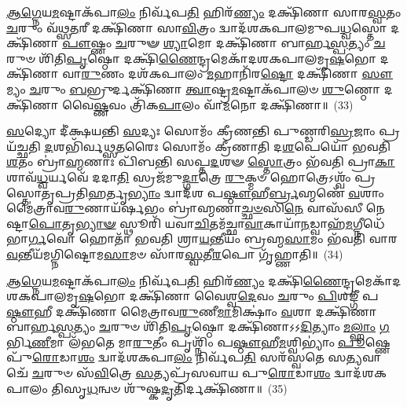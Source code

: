 {\anuvakamend[{\-\ul{𑌸}\-𑌤𑍍𑌯𑍗𑌜𑌾॑𑌶𑍍𑌚𑌤𑍍𑌵𑌾\-\ul{𑌰𑌿}\-\-\ul{𑍞}\-𑌶𑌚𑍍𑌚᳴}]}%

\-\ul{𑌆}\-\-\ul{𑌗𑍍𑌨𑍇}\-𑌯\-\ul{𑌮}\-𑌷𑍍𑌟𑌾\-𑌕᳴𑌪𑌾\-\ul{𑌲𑌂} 𑌨𑌿𑌰𑍍𑌵᳴𑌪\-\ul{𑌤𑌿} 𑌹𑌿𑌰᳴\-\ul{𑌣𑍍𑌯𑌂} 𑌦𑌕𑍍𑌷𑌿᳴𑌣𑌾 𑌸𑌾𑌰\-\ul{𑌸𑍍𑌵}\-𑌤𑌂 \ul{𑌚}\-𑌰𑍁𑌂 𑌵᳴𑌥𑍍𑌸\-\ul{𑌤}\-𑌰𑍀 𑌦𑌕𑍍𑌷𑌿᳴𑌣𑌾 𑌸𑌾\-\ul{𑌵𑌿}\-𑌤𑍍𑌰𑌂 𑌦𑍍𑌵𑌾𑌦᳴𑌶\-𑌕𑌪𑌾𑌲𑌮𑍁𑌪\-\ul{𑌧𑍍𑌵}\-𑌸𑍍𑌤𑍋 𑌦𑌕𑍍𑌷𑌿᳴𑌣𑌾 \ul{𑌪𑍗}\-𑌷𑍍𑌣𑌂 \ul{𑌚}\-𑌰𑍁𑍟 \ul{𑌶𑍍𑌯𑌾}\-𑌮𑍋 𑌦𑌕𑍍𑌷𑌿᳴𑌣𑌾 𑌬𑌾𑌰𑍍\mbox{}𑌹\-\ul{𑌸𑍍𑌪}\-𑌤𑍍𑌯𑌂 \ul{𑌚}\-𑌰𑍁𑍞 𑌶𑌿᳴𑌤𑌿\-\ul{𑌪𑍃}\-𑌷𑍍𑌠𑍋 𑌦𑌕𑍍𑌷𑌿᳴\-\ul{𑌣𑍈}\-𑌨𑍍𑌦𑍍𑌰𑌮𑍇𑌕𑌾᳴\-𑌦𑌶\-𑌕𑌪𑌾𑌲𑌮𑍃\-\ul{𑌷}\-𑌭𑍋 𑌦𑌕𑍍𑌷𑌿᳴𑌣𑌾 𑌵𑌾\-\ul{𑌰𑍁}\-𑌣𑌂 𑌦𑌶᳴\-𑌕𑌪𑌾𑌲𑌂 \ul{𑌮}\-𑌹𑌾𑌨𑌿᳴𑌰\-\ul{𑌷𑍍𑌟𑍋} 𑌦𑌕𑍍𑌷𑌿᳴𑌣𑌾 \ul{𑌸𑍗}\-𑌮𑍍𑌯𑌂 \ul{𑌚}\-𑌰𑍁𑌂 \ul{𑌬}\-𑌭𑍍𑌰𑍁𑌰𑍍𑌦𑌕𑍍𑌷𑌿᳴𑌣𑌾 \ul{𑌤𑍍𑌵𑌾}\-𑌷𑍍𑌟𑍍𑌰\-\ul{𑌮}\-𑌷𑍍𑌟𑌾𑌕᳴𑌪𑌾𑌲𑍞 \ul{𑌶𑍁}\-𑌣𑍍𑌠𑍋 𑌦𑌕𑍍𑌷𑌿᳴𑌣𑌾 𑌵𑍈\-\ul{𑌷𑍍𑌣}\-𑌵𑌂 𑌤𑍍𑌰𑌿᳴𑌕\-\ul{𑌪𑌾}\-𑌲𑌂 𑌵𑌾᳴\-\ul{𑌮}\-𑌨𑍋 𑌦𑌕𑍍𑌷𑌿᳴𑌣𑌾॥~(33)

{\anuvakamend[{\-\ul{𑌆}\-\-\ul{𑌗𑍍𑌨𑍇}\-𑌯𑌂 𑌦𑍍𑌵𑌿𑌚᳴𑌤𑍍𑌵𑌾𑌰𑌿𑍞𑌶𑌤𑍍}]}%

\-\ul{𑌸}\-𑌦𑍍𑌯𑍋 𑌦𑍀॑𑌕𑍍𑌷𑌯𑌨𑍍𑌤𑌿 \ul{𑌸}\-𑌦𑍍𑌯𑌃 𑌸𑍋𑌮𑌂᳴ 𑌕𑍍𑌰𑍀𑌣𑌨𑍍𑌤𑌿 𑌪𑍁𑌣𑍍𑌡𑌰𑌿\-\ul{𑌸𑍍𑌰}\-𑌜𑌾𑌂 𑌪𑍍𑌰 𑌯᳴𑌚𑍍𑌛𑌤𑌿 \ul{𑌦}\-𑌶𑌭𑌿᳴𑌰𑍍𑌵𑌥𑍍𑌸\-\ul{𑌤}\-𑌰𑍈𑌃 𑌸𑍋𑌮𑌂᳴ 𑌕𑍍𑌰𑍀𑌣𑌾𑌤𑌿 𑌦\-\ul{𑌶}\-𑌪𑍇𑌯𑍋᳴ 𑌭𑌵𑌤𑌿 \ul{𑌶}\-𑌤𑌂 𑌬𑍍𑌰𑌾॑\-\ul{𑌹𑍍𑌮}\-𑌣𑌾𑌃 𑌪𑌿᳴𑌬𑌨𑍍𑌤𑌿 𑌸𑌪𑍍𑌤\-\ul{𑌦}\-𑌶𑍟 \ul{𑌸𑍍𑌤𑍋}\-𑌤𑍍𑌰𑌂 𑌭᳴𑌵𑌤𑌿 𑌪𑍍𑌰𑌾\-\ul{𑌕𑌾}\-𑌶𑌾𑌵᳴\-\ul{𑌧𑍍𑌵}\-𑌰𑍍𑌯𑌵𑍇᳴ 𑌦𑌦𑌾\-\ul{𑌤𑌿} 𑌸𑍍𑌰𑌜᳴𑌮𑍁\-\ul{𑌦𑍍𑌗𑌾}\-𑌤𑍍𑌰𑍇 \ul{𑌰𑍁}\-𑌕𑍍𑌮𑍞 𑌹𑍋𑌤𑍍𑌰𑍇\-𑌽𑌶𑍍𑌵𑌂᳴ 𑌪𑍍𑌰𑌸𑍍𑌤𑍋𑌤𑍃𑌪𑍍𑌰𑌤𑌿\-\ul{𑌹}\-𑌰𑍍𑌤𑍃\-\ul{𑌭𑍍𑌯𑌾𑌂} 𑌦𑍍𑌵𑌾𑌦᳴𑌶 𑌪\-\ul{𑌷𑍍𑌠𑍗}\-𑌹𑍀\-\ul{𑌰𑍍𑌬𑍍𑌰}\-𑌹𑍍𑌮𑌣𑍇᳴ \ul{𑌵}\-𑌶𑌾𑌂 𑌮𑍈॑𑌤𑍍𑌰𑌾𑌵\-\ul{𑌰𑍁}\-𑌣𑌾𑌯᳴𑌰𑍍\mbox{}\-\ul{𑌷}\-𑌭𑌂 𑌬𑍍𑌰𑌾॑𑌹𑍍𑌮𑌣𑌾\-\ul{𑌚𑍍𑌛}\-\-\ul{𑍞}\-𑌸𑌿\-\ul{𑌨𑍇} 𑌵𑌾𑌸᳴𑌸𑍀 𑌨𑍇𑌷𑍍𑌟𑌾\-\ul{𑌪𑍋}\-𑌤𑍃\-\ul{𑌭𑍍𑌯𑌾}\-\-\ul{𑍟} 𑌸𑍍𑌥𑍂𑌰𑌿᳴ 𑌯𑌵𑌾\-\ul{𑌚𑌿}\-𑌤𑌮᳴𑌚𑍍𑌛𑌾\-\ul{𑌵𑌾}\-𑌕𑌾𑌯𑌾᳴\-\ul{𑌨}\-𑌡𑍍𑌵𑌾𑌹᳴\-\ul{𑌮}\-𑌗𑍍𑌨𑍀𑌧𑍇᳴ 𑌭𑌾\-\ul{𑌰𑍍𑌗}\-𑌵𑍋 𑌹𑍋𑌤𑌾᳴ 𑌭𑌵𑌤𑌿 𑌶𑍍𑌰𑌾\-\ul{𑌯}\-𑌨𑍍𑌤𑍀𑌯𑌂᳴ 𑌬𑍍𑌰𑌹𑍍𑌮\-\ul{𑌸𑌾}\-𑌮𑌂 𑌭᳴𑌵𑌤𑌿 𑌵𑌾𑌰\-\ul{𑌵}\-𑌨𑍍𑌤𑍀𑌯᳴𑌮𑌗𑍍𑌨𑌿𑌷𑍍𑌟𑍋𑌮\-\ul{𑌸𑌾}\-𑌮𑍞 𑌸𑌾᳴𑌰\-\ul{𑌸𑍍𑌵}\-𑌤𑍀\-\ul{𑌰}\-𑌪𑍋 𑌗𑍃᳴𑌹𑍍𑌣𑌾𑌤𑌿॥~(34)

{\anuvakamend[{\-\ul{𑌵𑌾}\-\-\ul{𑌰}\-\-\ul{𑌵}\-𑌨𑍍𑌤𑍀𑌯𑌂᳴ \ul{𑌚}\-𑌤𑍍𑌵𑌾𑌰𑌿᳴ 𑌚}]}%

\-\ul{𑌆}\-\-\ul{𑌗𑍍𑌨𑍇}\-𑌯\-\ul{𑌮}\-𑌷𑍍𑌟𑌾\-𑌕᳴𑌪𑌾\-\ul{𑌲𑌂} 𑌨𑌿𑌰𑍍𑌵᳴𑌪\-\ul{𑌤𑌿} 𑌹𑌿𑌰᳴\-\ul{𑌣𑍍𑌯𑌂} 𑌦𑌕𑍍𑌷𑌿᳴\-\ul{𑌣𑍈}\-𑌨𑍍𑌦𑍍𑌰𑌮𑍇𑌕𑌾᳴\-𑌦𑌶\-𑌕𑌪𑌾𑌲𑌮𑍃\-\ul{𑌷}\-𑌭𑍋 𑌦𑌕𑍍𑌷𑌿᳴𑌣𑌾 𑌵𑍈𑌶𑍍𑌵\-\ul{𑌦𑍇}\-𑌵𑌂 \ul{𑌚}\-𑌰𑍁𑌂 \ul{𑌪𑌿}\-𑌶𑌙𑍍𑌗𑍀᳴ 𑌪\-\ul{𑌷𑍍𑌠𑍗}\-𑌹𑍀 𑌦𑌕𑍍𑌷𑌿᳴𑌣𑌾 𑌮𑍈𑌤𑍍𑌰𑌾𑌵\-\ul{𑌰𑍁}\-𑌣𑍀\-\ul{𑌮𑌾}\-𑌮𑌿𑌕𑍍𑌷𑌾𑌂॑ \ul{𑌵}\-𑌶𑌾 𑌦𑌕𑍍𑌷𑌿᳴𑌣𑌾 𑌬𑌾𑌰𑍍\mbox{}𑌹\-\ul{𑌸𑍍𑌪}\-𑌤𑍍𑌯𑌂 \ul{𑌚}\-𑌰𑍁𑍞 𑌶𑌿᳴𑌤𑌿\-\ul{𑌪𑍃}\-𑌷𑍍𑌠𑍋 𑌦𑌕𑍍𑌷𑌿᳴𑌣𑌾\-𑌽\-𑌽\-\ul{𑌦𑌿}\-𑌤𑍍𑌯𑌾𑌂 \ul{𑌮}\-\-\ul{𑌲𑍍}\-\mbox{}𑌹𑌾𑌂 \ul{𑌗}\-𑌰𑍍𑌭𑌿\-\ul{𑌣𑍀}\-𑌮𑌾 𑌲᳴𑌭𑌤𑍇 𑌮𑌾\-\ul{𑌰𑍁}\-𑌤𑍀𑌂 𑌪𑍃𑌶𑍍𑌨𑌿𑌂᳴ 𑌪\-\ul{𑌷𑍍𑌠𑍗}\-𑌹𑍀\-\ul{𑌮}\-𑌶𑍍𑌵𑌿\-𑌭𑍍𑌯𑌾𑌂॑ \ul{𑌪𑍂}\-𑌷𑍍𑌣𑍇 𑌪𑍁᳴\-\ul{𑌰𑍋}\-𑌡𑌾\-\ul{𑌶𑌂} 𑌦𑍍𑌵𑌾𑌦᳴𑌶\-𑌕𑌪𑌾\-\ul{𑌲𑌂} 𑌨𑌿𑌰𑍍𑌵᳴𑌪\-\ul{𑌤𑌿} 𑌸𑌰᳴𑌸𑍍𑌵𑌤𑍇 𑌸\-\ul{𑌤𑍍𑌯}\-𑌵𑌾𑌚𑍇᳴ \ul{𑌚}\-𑌰𑍁𑍞 𑌸᳴\-\ul{𑌵𑌿}\-𑌤𑍍𑌰𑍇 \ul{𑌸}\-𑌤𑍍𑌯𑌪𑍍𑌰᳴𑌸𑌵𑌾𑌯 𑌪𑍁\-\ul{𑌰𑍋}\-𑌡𑌾\-\ul{𑌶𑌂} 𑌦𑍍𑌵𑌾𑌦᳴𑌶\-𑌕𑌪𑌾𑌲𑌂 𑌤𑌿𑌸𑍃\-\ul{𑌧}\-𑌨𑍍𑌵𑍞 𑌶𑍁᳴𑌷𑍍𑌕\-\ul{𑌦𑍃}\-𑌤𑌿𑌰𑍍𑌦𑌕𑍍𑌷𑌿᳴𑌣𑌾॥~(35)

